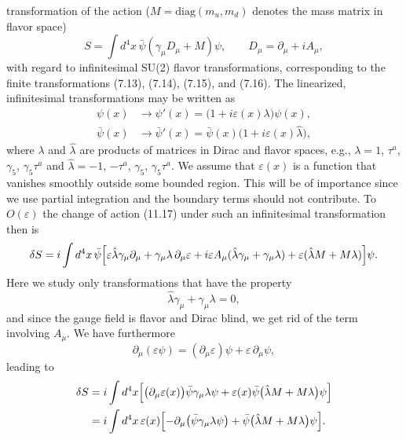 transformation of the action ($M = \mathrm{diag}(m_u, m_d)$ denotes the mass matrix in
flavor space)
\begin{equation}
S = \int d^4x\, \bar{\psi}(\gamma_\mu D_\mu + M)\psi , \qquad
D_\mu = \partial_\mu + iA_\mu ,
\end{equation}
with regard to infinitesimal SU(2) flavor transformations, corresponding to
the finite transformations (7.13), (7.14), (7.15), and (7.16). The linearized,
infinitesimal transformations may be written as
\begin{equation}
\begin{aligned}
\psi(x) &\to \psi'(x) = \bigl(1 + i\varepsilon(x)\lambda\bigr)\psi(x) , \\
\bar{\psi}(x) &\to \bar{\psi}'(x) = \bar{\psi}(x)\bigl(1 + i\varepsilon(x)\hat{\lambda}\bigr) ,
\end{aligned}
\end{equation}
where $\lambda$ and $\hat{\lambda}$ are products of matrices in Dirac and flavor spaces, e.g., $\lambda = 1$,
$\tau^a$, $\gamma_5$, $\gamma_5\tau^a$ and $\hat{\lambda} = -1$, $-\tau^a$, $\gamma_5$, $\gamma_5\tau^a$. We assume that $\varepsilon(x)$ is a function that
vanishes smoothly outside some bounded region. This will be of importance
since we use partial integration and the boundary terms should not contribute.
To $O(\varepsilon)$ the change of action (11.17) under such an infinitesimal transformation then is
\begin{equation}
\delta S = i \int d^4x\,
\bar{\psi}\Bigl[\varepsilon\hat{\lambda}\gamma_\mu\partial_\mu + \gamma_\mu\lambda\,\partial_\mu\varepsilon
+ i\varepsilon A_\mu(\hat{\lambda}\gamma_\mu + \gamma_\mu\lambda)
+ \varepsilon(\hat{\lambda}M + M\lambda)\Bigr]\psi .
\end{equation}
Here we study only transformations that have the property
\begin{equation}
\hat{\lambda}\gamma_\mu + \gamma_\mu\lambda = 0 ,
\end{equation}
and since the gauge field is flavor and Dirac blind, we get rid of the term
involving $A_\mu$. We have furthermore
\begin{equation}
\partial_\mu(\varepsilon\psi) = (\partial_\mu\varepsilon)\psi + \varepsilon\,\partial_\mu\psi ,
\end{equation}
leading to
\begin{equation}
\begin{aligned}
\delta S &= i \int d^4x \Bigl[\bigl(\partial_\mu\varepsilon(x)\bigr)\bar{\psi}\gamma_\mu\lambda\psi
+ \varepsilon(x)\bar{\psi}\bigl(\hat{\lambda}M + M\lambda\bigr)\psi\Bigr] \\
&= i \int d^4x\, \varepsilon(x)\Bigl[-\partial_\mu\bigl(\bar{\psi}\gamma_\mu\lambda\psi\bigr)
+ \bar{\psi}\bigl(\hat{\lambda}M + M\lambda\bigr)\psi\Bigr] .
\end{aligned}
\end{equation}
